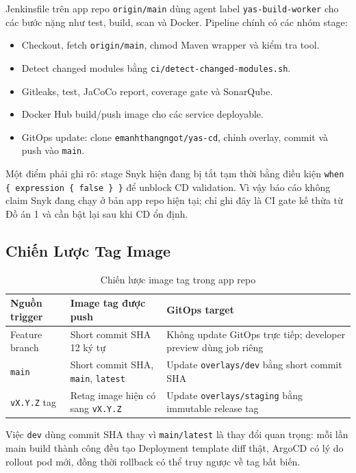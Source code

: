 Jenkinsfile trên app repo \texttt{origin/main} dùng agent label \texttt{yas-build-worker}
cho các bước nặng như test, build, scan và Docker. Pipeline chính có các nhóm stage:

\begin{itemize}
    \item Checkout, fetch \texttt{origin/main}, chmod Maven wrapper và kiểm tra tool.
    \item Detect changed modules bằng \texttt{ci/detect-changed-modules.sh}.
    \item Gitleaks, test, JaCoCo report, coverage gate và SonarQube.
    \item Docker Hub build/push image cho các service deployable.
    \item GitOps update: clone \texttt{emanhthangngot/yas-cd}, chỉnh overlay, commit và push vào \texttt{main}.
\end{itemize}

Một điểm phải ghi rõ: stage Snyk hiện đang bị tắt tạm thời bằng điều kiện
\texttt{when \{ expression \{ false \} \}} để unblock CD validation. Vì vậy báo cáo
không claim Snyk đang chạy ở bản app repo hiện tại; chỉ ghi đây là CI gate kế thừa
từ Đồ án 1 và cần bật lại sau khi CD ổn định.

\subsection{Chiến Lược Tag Image}

\begin{table}[H]
\centering
\caption{Chiến lược image tag trong app repo}
\begin{tabular}{|p{3.2cm}|p{5.2cm}|p{5.2cm}|}
\hline
\textbf{Nguồn trigger} & \textbf{Image tag được push} & \textbf{GitOps target} \\
\hline
Feature branch & Short commit SHA 12 ký tự & Không update GitOps trực tiếp; developer preview dùng job riêng \\
\hline
\texttt{main} & Short commit SHA, \texttt{main}, \texttt{latest} & Update \texttt{overlays/dev} bằng short commit SHA \\
\hline
\texttt{vX.Y.Z} tag & Retag image hiện có sang \texttt{vX.Y.Z} & Update \texttt{overlays/staging} bằng immutable release tag \\
\hline
\end{tabular}
\end{table}

Việc \texttt{dev} dùng commit SHA thay vì \texttt{main/latest} là thay đổi quan trọng:
mỗi lần main build thành công đều tạo Deployment template diff thật, ArgoCD có lý do
rollout pod mới, đồng thời rollback có thể truy ngược về tag bất biến.

